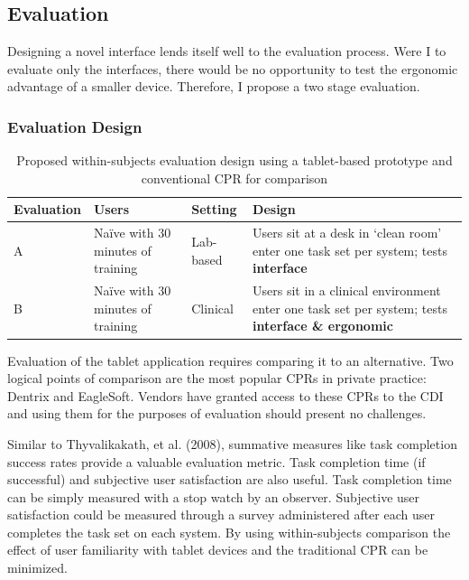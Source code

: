 \documentclass[11pt]{article}
\newcommand{\ra}[1]{\renewcommand{\arraystretch}{#1}}
\begin{document}
\subsection{Evaluation}
\label{eval}

Designing a novel interface lends itself well to the evaluation process. Were I to evaluate only the interfaces, there would be no opportunity to test the ergonomic advantage of a smaller device. Therefore, I propose a two stage evaluation.

\subsubsection{Evaluation Design}
\reversemarginpar
{}
\begin{table}[h]
	\caption{Proposed within-subjects evaluation design using a tablet-based prototype and conventional CPR for comparison}
	\begin{center}
	\ra{1.3}
\begin{tabular*}{\textwidth}{p{1.9cm}p{2cm}p{2cm}p{5cm}}  

\toprule
\textbf{Evaluation} & \textbf{Users} & \textbf{Setting} & \textbf{Design} \\
\midrule
A & Na\"{i}ve with 30 minutes of training & Lab-based & Users sit at a desk in `clean room' enter one task set per system; tests \textbf{interface} \\ 
B & Na\"{i}ve with 30 minutes of training & Clinical & Users sit in a clinical environment enter one task set per system; tests \textbf{interface \& ergonomic} \\
\bottomrule
\end{tabular*} \end{center}\end{table}

Evaluation of the tablet application requires comparing it to an alternative. Two logical points of comparison are the most popular CPRs in private practice: Dentrix and EagleSoft. Vendors have granted access to these CPRs to the CDI and using them for the purposes of evaluation should present no challenges.

Similar to Thyvalikakath, et al. (2008), summative measures like task completion success rates provide a valuable evaluation metric. Task completion time (if successful) and subjective user satisfaction are also useful\cite{Chin1998Development-of-}. Task completion time can be simply measured with a stop watch by an observer. Subjective user satisfaction could be measured through a survey administered after each user completes the task set on each system. By using within-subjects comparison the effect of user familiarity with tablet devices and the traditional CPR can be minimized.
\end{document}
